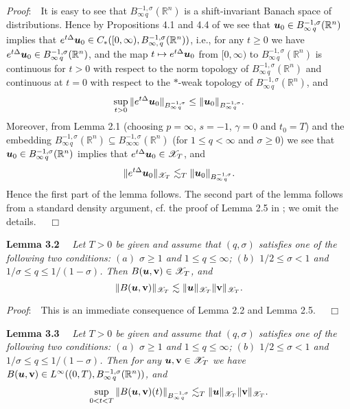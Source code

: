 \documentclass[11pt]{article}
\newcommand{\bfu}{{\mbox{\boldmath $u$}}}
\begin{document}
  {\em Proof}:\ \ It is easy to see that $B^{-1,\sigma}_{\infty\, q}(\mathbb{R}^n)$ is a shift-invariant Banach space of distributions. Hence by
  Propositions 4.1 and 4.4 of \cite{LEM02} we see that $\bfu_0\in B^{-1,\sigma}_{\infty\, q}(\mathbb{R}^n)$ implies that $e^{t\Delta}\bfu_0\in
  C_\ast([0,\infty),B^{-1,\sigma}_{\infty,\, q}(\mathbb{R}^n))$, i.e., for any $t\geqslant 0$ we have $e^{t\Delta}\bfu_0\in
  B^{-1,\sigma}_{\infty\, q}(\mathbb{R}^n)$, and the map $t\mapsto e^{t\Delta}\bfu_0$ from $[0,\infty)$ to $B^{-1,\sigma}_{\infty\, q}(\mathbb{R}^n)$
  is continuous for $t>0$ with respect to the norm topology of $B^{-1,\sigma}_{\infty\, q}(\mathbb{R}^n)$ and continuous at $t=0$ with respect to the
  $\ast$-weak topology of $B^{-1,\sigma}_{\infty\, q}(\mathbb{R}^n)$, and
$$
  \sup_{t>0}\|e^{t\Delta}\bfu_0\|_{B^{-1,\sigma}_{\infty\,q}}\leq\|\bfu_0\|_{B^{-1,\sigma}_{\infty\,q}}.
$$
  Moreover, from Lemma 2.1 (choosing $p=\infty$, $s=-1$, $\gamma=0$ and $t_0=T$) and the embedding $B^{-1,\sigma}_{\infty\, q}(\mathbb{R}^n)
  \subseteq B^{-1,\sigma}_{\infty\infty}(\mathbb{R}^n)$ (for $1\leqslant q<\infty$ and $\sigma\geqslant 0$) we see that $\bfu_0\in
  B^{-1,\sigma}_{\infty\, q}(\mathbb{R}^n)$ implies that $e^{t\Delta}\bfu_0\in\mathscr{X}_T$, and
$$
  \|e^{t\Delta}\bfu_0\|_{\mathscr{X}_T}\lesssim_T\|\bfu_0\|_{B^{-1,\sigma}_{\infty\,q}}.
$$
  Hence the first part of the lemma follows. The second part of the lemma follows from a standard density argument, cf. the proof of Lemma 2.5 in
  \cite{Cui}; we omit the details. $\quad\Box$
\medskip

  {\bf Lemma 3.2} \ \ {\em Let $T>0$ be given and assume that $(q,\sigma)$ satisfies one of the following two conditions: $(a)$ $\sigma\geqslant 1$
  and $1\leqslant q\leqslant\infty$; $(b)$ $1/2\leqslant\sigma<1$ and $1/\sigma\leqslant q\leqslant 1/(1\!-\!\sigma)$. Then $B(\bfu,\mathbf{v})\in
  {\mathscr{X}_T}$, and}
\begin{equation}
  \|B(\bfu,\mathbf{v})\|_{\mathscr{X}_T}\lesssim\|\bfu\|_{\mathscr{X}_T}\|\mathbf{v}\|_{\mathscr{X}_T}.
\end{equation}

  {\em Proof}:\ \ This is an immediate consequence of Lemma 2.2 and Lemma 2.5. $\quad\Box$
\medskip

  {\bf Lemma 3.3} \ \ {\em Let $T>0$ be given and assume that $(q,\sigma)$ satisfies one of the following two conditions: $(a)$ $\sigma\geqslant 1$
  and $1\leqslant q\leqslant\infty$; $(b)$ $1/2\leqslant\sigma<1$ and $1/\sigma\leqslant q\leqslant 1/(1\!-\!\sigma)$. Then for any $\bfu,\mathbf{v}
  \in {\mathscr{X}_T}$ we have $B(\bfu,\mathbf{v})\in L^{\infty}((0,T),B^{-1,\sigma}_{\infty\, q}(\mathbb{R}^n))$, and}
\begin{equation}
  \sup_{0<t<T}\|B(\bfu,\mathbf{v})(t)\|_{B^{-1,\sigma}_{\infty\, q}}\lesssim_T\|\bfu\|_{\mathscr{X}_T}\|\mathbf{v}\|_{\mathscr{X}_T}.
\end{equation}
\end{document}
